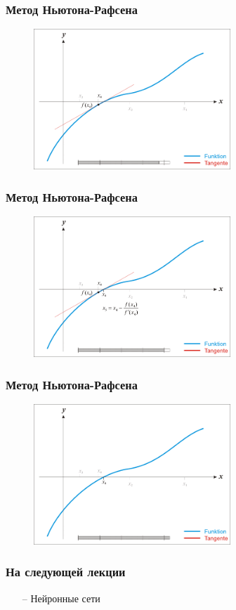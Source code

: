 \documentclass[12pt, aspectratio=169]{beamer}
\begin{document}
\begin{frame}\frametitle{Метод Ньютона-Рафсена}
\begin{figure}[htbp]
  \includegraphics[height=150pt, keepaspectratio = true]{images/newton-15}   
\end{figure}
\end{frame}
\begin{frame}\frametitle{Метод Ньютона-Рафсена}
\begin{figure}[htbp]
  \includegraphics[height=150pt, keepaspectratio = true]{images/newton-16}   
\end{figure}
\end{frame}
\begin{frame}\frametitle{Метод Ньютона-Рафсена}
\begin{figure}[htbp]
  \includegraphics[height=150pt, keepaspectratio = true]{images/newton-17}   
\end{figure}
\end{frame}




\begin{frame}\frametitle{На следующей лекции}
\begin{itemize}
\item[--] Нейронные сети
\end{itemize}
\end{frame}
\end{document}
